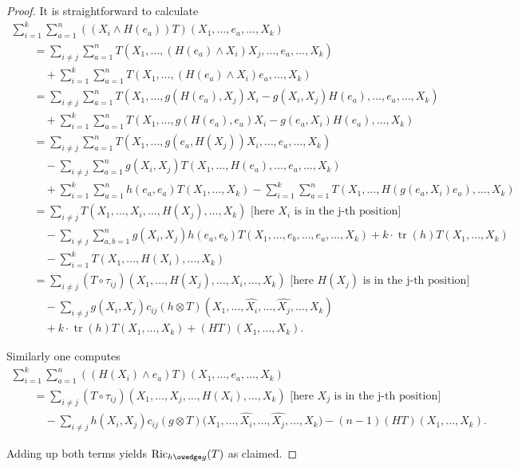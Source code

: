 \documentclass[pdftex]{sigma}
\numberwithin{equation}{section}
\newcommand{\Ric} {\operatorname{Ric}}
\newcommand{ \tr } {\operatorname{tr}}
\begin{document}
\begin{proof}
It is straightforward to calculate
\begin{gather*}
\sum_{i=1}^k \sum_{a=1}^n  ((X_i \wedge H(e_a)) T)(X_1, \dots, e_a, \dots, X_k) \\
\qquad{} =  \sum_{i \neq j} \sum_{a=1}^n T( X_1, \dots, (H(e_a) \wedge X_i) X_j, \dots, e_a, \dots, X_k) \\
 \qquad\quad{} + \sum_{i=1}^k \sum_{a=1}^n T(X_1, \dots, (H(e_a) \wedge X_i)e_a, \dots, X_k) \\
\qquad {}=  \sum_{i \neq j} \sum_{a=1}^n T( X_1, \dots, g(H(e_a), X_j) X_i - g(X_i, X_j)H(e_a), \dots, e_a, \dots, X_k) \\
\qquad\quad{}+ \sum_{i=1}^k \sum_{a=1}^n T(X_1, \dots, g(H(e_a),e_a) X_i - g(e_a, X_i) H(e_a), \dots, X_k) \\
\qquad {}=  \sum_{i \neq j} \sum_{a=1}^n T( X_1, \dots, g(e_a, H(X_j)) X_i, \dots, e_a, \dots, X_k) \\
\qquad\quad{} - \sum_{i \neq j} \sum_{a=1}^n g(X_i, X_j) T( X_1, \dots, H(e_a), \dots, e_a, \dots, X_k) \\
 \qquad\quad{}+ \sum_{i=1}^k \sum_{a=1}^n h(e_a,e_a) T(X_1, \dots, X_k)
 - \sum_{i=1}^k \sum_{a=1}^n T(X_1, \dots, H  ( g(e_a, X_i)e_a  ), \dots, X_k) \\
\qquad {}=  \sum_{i \neq j} T ( X_1, \dots, X_i, \dots, H(X_j), \dots, X_k) \text{ [here } X_i \text{ is in the j-th position]} \\
\qquad\quad{}- \sum_{i \neq j} \sum_{a,b=1}^n  g(X_i, X_j) h(e_a, e_b) T( X_1, \dots, e_b, \dots, e_a, \dots, X_k)
 + k \cdot \tr( h ) T(X_1, \dots, X_k) \\
\qquad\quad{} - \sum_{i=1}^k T(X_1, \dots, H(X_i), \dots, X_k) \\
\qquad {}=  \sum_{i \neq j} (T \circ \tau_{ij}) ( X_1, \dots, H(X_j), \dots, X_i, \dots, X_k) \text{ [here } H(X_j) \text{ is in the j-th position]} \\
\qquad\quad{} - \sum_{i \neq j} g(X_i, X_j) c_{ij} (h \otimes T)( X_1, \dots, \widehat{X_i}, \dots, \widehat{X_j}, \dots, X_k) \\
 \qquad\quad{} + k \cdot \tr( h ) T(X_1, \dots, X_k)  + (HT)(X_1, \dots, X_k).
\end{gather*}

Similarly one computes
\begin{gather*}
\sum_{i=1}^k \sum_{a=1}^n   ((H(X_i) \wedge e_a) T)(X_1, \dots, e_a, \dots, X_k) \\
\qquad{} =   \sum_{i \neq j} (T \circ \tau_{ij}) ( X_1, \dots, X_j, \dots, H(X_i), \dots, X_k) \text{ [here } X_j \text{ is in the j-th position]} \\
\qquad\quad{}  -\! \sum_{i \neq j} h(X_i, X_j) c_{ij} (g \otimes T)\big(X_1, {\dots}, \widehat{X_i}, {\dots}, \widehat{X_j}, {\dots}, X_k\big)   - (n-1) (HT) (X_1, {\dots}, X_k) .
\end{gather*}

Adding up both terms yields $\Ric_{h \owedge g}(T)$ as claimed.
\end{proof}
\end{document}
